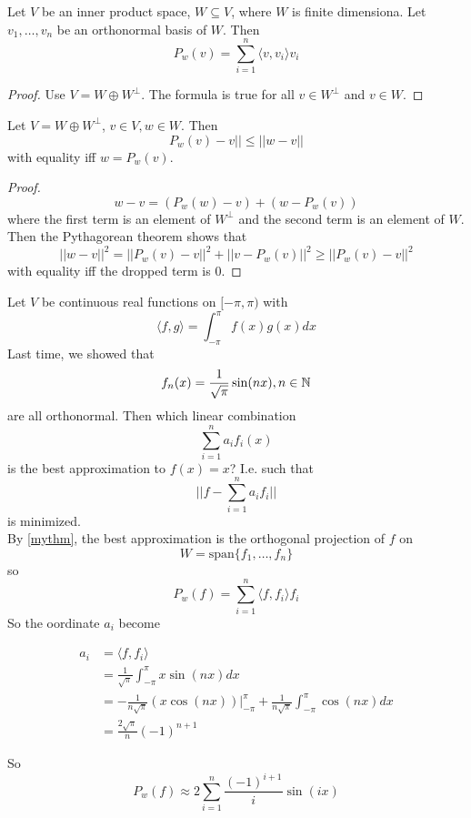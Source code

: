 \documentclass[12pt]{article}
\begin{document}
\begin{prop}
	Let $V$ be an inner product space, $W \subseteq V$, where $W$ is finite dimensiona. Let $v_1,\dots,v_n$ be an orthonormal basis of $W$. Then
	$$P_w(v) = \sum_{i=1}^n \langle v,v_i \rangle v_i$$
\end{prop}

\begin{proof}
	Use $V = W \oplus W^\perp$. The formula is true for all $v \in W^\perp$ and $v \in W$.
\end{proof}

\begin{thm}\label{mythm}
	Let $V = W \oplus W^\perp$, $v \in V, w \in W$. Then
	$$P_w(v) - v || \leq ||w-v||$$
	with equality iff $w = P_w(v)$.
\end{thm}

\begin{proof}
	$$w - v = (P_w(w) - v) + (w - P_w(v))$$
	where the first term is an element of $W^\perp$ and the second term is an element of $W$. Then the Pythagorean theorem shows that
	$$||w-v||^2 = ||P_w(v) - v||^2 + ||v - P_w(v)||^2 \geq ||P_w(v) - v||^2$$
	with equality iff the dropped term is 0.
\end{proof}

\begin{ex}
	Let $V$ be continuous real functions on $[-\pi,\pi)$ with
	$$\langle f,g \rangle = \int_{-\pi}^\pi f(x)g(x)dx$$
	Last time, we showed that
	$$f_n(x) = \frac{1}{\sqrt{\pi}}\sin(nx), n \in \mathbb{N}$$
	are all orthonormal. Then which linear combination
	$$\sum_{i=1}^n a_if_i(x)$$
	is the best approximation to $f(x) = x$? I.e. such that
	$$||f - \sum_{i=1}^n a_if_i||$$
	is minimized. \\
	By \ref{mythm}, the best approximation is the orthogonal projection of $f$ on
	$$W = \text{span}\{f_1,\dots,f_n\}$$
	so
	$$P_w(f) = \sum_{i=1}^n \langle f,f_i \rangle f_i$$
	So the oordinate $a_i$ become
	
	\begin{align*}
		a_i &= \langle f,f_i \rangle \\
		    &= \frac{1}{\sqrt{\pi}} \int_{-\pi}^\pi x\sin(nx)dx \\
		    &= -\frac{1}{n\sqrt{\pi}} (x\cos(nx)) |_{-\pi}^\pi + \frac{1}{n\sqrt{\pi}} \int_{-\pi}^\pi \cos(nx)dx \\
		    &= \frac{2\sqrt{\pi}}{n}(-1)^{n+1}
	\end{align*}

	So
	$$P_w(f) \approx 2\sum_{i=1}^n \frac{(-1)^{i+1}}{i}\sin(ix)$$
\end{ex}
\end{document}
